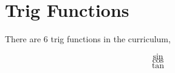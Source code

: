 \documentclass[../main.tex]{subfiles}
\begin{document}
\section{Trig Functions}

There are 6 trig functions in the curriculum,

\[ \sin \]
\[ \cos \]
\[ \tan \]
\end{document}
